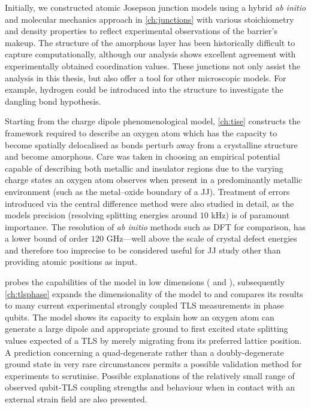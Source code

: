 Initially, we constructed atomic Josepson junction models using a hybrid \textit{ab initio} and molecular mechanics approach in \cref{ch:junctions} with various stoichiometry and density properties to reflect experimental observations of the barrier's makeup.
The structure of the amorphous layer has been historically difficult to capture computationally, although our analysis shows excellent agreement with experimentally obtained coordination values.
These junctions not only assist the analysis in this thesis, but also offer a tool for other microscopic models.
For example, hydrogen could be introduced into the structure to investigate the dangling bond hypothesis.

Starting from the charge dipole phenomenological model, \cref{ch:tise} constructs the framework required to describe an oxygen atom which has the capacity to become spatially delocalised as bonds perturb away from a crystalline structure and become amorphous.
Care was taken in choosing an empirical potential capable of describing both metallic and insulator regions due to the varying charge states an oxygen atom observes when present in a predominantly metallic environment (such as the metal--oxide boundary of a JJ).
Treatment of errors introduced via the central difference method were also studied in detail, as the models precision (resolving splitting energies around $10$ kHz) is of paramount importance.
The resolution of \textit{ab initio} methods such as DFT for comparison, has a lower bound of order $120$ GHz---well above the scale of crystal defect energies and therefore too imprecise to be considered useful for JJ study other than providing atomic positions as input.

 probes the capabilities of the model in low dimensions ( and ), subsequently \cref{ch:tlsphase} expands the dimensionality of the model to  and compares its results to many current experimental strongly coupled TLS measurements in phase qubits.
The model shows its capacity to explain how an oxygen atom can generate a large dipole and appropriate ground to first excited state splitting values expected of a TLS by merely migrating from its preferred lattice position.
A prediction concerning a quad-degenerate rather than a doubly-degenerate ground state in very rare circumstances permits a possible validation method for experiments to scrutinise.
Possible explanations of the relatively small range of observed qubit-TLS coupling strengths and behaviour when in contact with an external strain field are also presented.

